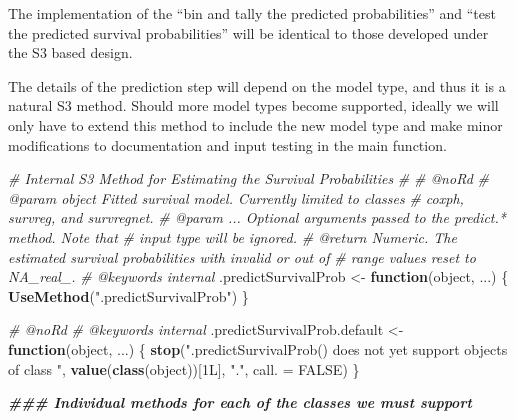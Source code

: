 \documentclass[
]{book}
\newenvironment{Shaded}{\begin{snugshade}}{\end{snugshade}}
\newcommand{\AttributeTok}[1]{\textcolor[rgb]{0.13,0.29,0.53}{#1}}
\newcommand{\CommentTok}[1]{\textcolor[rgb]{0.56,0.35,0.01}{\textit{#1}}}
\newcommand{\ConstantTok}[1]{\textcolor[rgb]{0.56,0.35,0.01}{#1}}
\newcommand{\ControlFlowTok}[1]{\textcolor[rgb]{0.13,0.29,0.53}{\textbf{#1}}}
\newcommand{\DocumentationTok}[1]{\textcolor[rgb]{0.56,0.35,0.01}{\textbf{\textit{#1}}}}
\newcommand{\FunctionTok}[1]{\textcolor[rgb]{0.13,0.29,0.53}{\textbf{#1}}}
\newcommand{\NormalTok}[1]{#1}
\newcommand{\OtherTok}[1]{\textcolor[rgb]{0.56,0.35,0.01}{#1}}
\newcommand{\StringTok}[1]{\textcolor[rgb]{0.31,0.60,0.02}{#1}}
\begin{document}
The implementation of the ``bin and tally the predicted probabilities'' and ``test the predicted survival probabilities'' will be identical to those developed under the S3 based design.

The details of the prediction step will depend on the model type, and thus it is a natural S3 method. Should more model types become supported, ideally we will only have to extend this method to include the new model type and make minor modifications to documentation and input testing in the main function.

\begin{Shaded}
\begin{Highlighting}[]
\CommentTok{\#\textquotesingle{} Internal S3 Method for Estimating the Survival Probabilities}
\CommentTok{\#\textquotesingle{} }
\CommentTok{\#\textquotesingle{} @noRd}
\CommentTok{\#\textquotesingle{} @param object Fitted survival model. Currently limited to classes}
\CommentTok{\#\textquotesingle{}   \textasciigrave{}coxph\textasciigrave{}, \textasciigrave{}survreg\textasciigrave{}, and \textasciigrave{}survregnet\textasciigrave{}.}
\CommentTok{\#\textquotesingle{} @param ... Optional arguments passed to the \textasciigrave{}predict.*\textasciigrave{} method. Note that}
\CommentTok{\#\textquotesingle{}   input \textasciigrave{}type\textasciigrave{} will be ignored.}
\CommentTok{\#\textquotesingle{} @return Numeric. The estimated survival probabilities with invalid or out of}
\CommentTok{\#\textquotesingle{}   range values reset to NA\_real\_.}
\CommentTok{\#\textquotesingle{} @keywords internal}
\NormalTok{.predictSurvivalProb }\OtherTok{\textless{}{-}} \ControlFlowTok{function}\NormalTok{(object, ...) \{ }
  \FunctionTok{UseMethod}\NormalTok{(}\StringTok{".predictSurvivalProb"}\NormalTok{) }
\NormalTok{\}}

\CommentTok{\#\textquotesingle{} @noRd}
\CommentTok{\#\textquotesingle{} @keywords internal}
\NormalTok{.predictSurvivalProb.default }\OtherTok{\textless{}{-}} \ControlFlowTok{function}\NormalTok{(object, ...) \{}
  \FunctionTok{stop}\NormalTok{(}\StringTok{"\textasciigrave{}.predictSurvivalProb()\textasciigrave{} does not yet support objects of class "}\NormalTok{,}
       \FunctionTok{value}\NormalTok{(}\FunctionTok{class}\NormalTok{(object))[1L], }\StringTok{"."}\NormalTok{, }\AttributeTok{call. =} \ConstantTok{FALSE}\NormalTok{)}
\NormalTok{\}}

\DocumentationTok{\#\#\# Individual methods for each of the classes we must support}


\end{Highlighting}
\end{Shaded}
\end{document}
